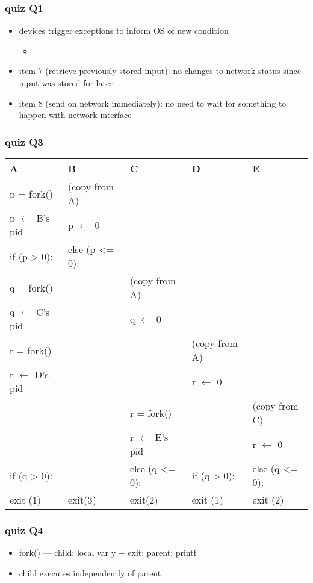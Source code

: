 
\begin{frame}
\frametitle{quiz Q1}
\begin{itemize}
\item devices trigger exceptions to inform OS of new condition
    \begin{itemize}
    \item {}
    \end{itemize}
\vspace{.5cm}
\item item 7 (retrieve previously stored input): no changes to network status since input was stored for later
\item item 8 (send on network immediately): no need to wait for something to happen with network interface
\end{itemize}
\end{frame}

\begin{frame}
\frametitle{quiz Q3}
\fontsize{13}{14}\selectfont
\begin{tabular}{l|l|l|l|l}
A & B & C & D & E \\ \hline
p = fork() & (copy from A)& & &\\
p $\leftarrow$ B's pid & p $\leftarrow$ 0 & & \\
if (p > 0): & else (p <= 0): & & \\
q = fork() & & (copy from A) & & \\
q $\leftarrow$ C's pid & & q $\leftarrow$ 0 &  \\
    r = fork()  &  & &  (copy from A) &  \\
r $\leftarrow$ D's pid  & & & r $\leftarrow$ 0 \\
~           & ~ & r = fork() &  & (copy from C)\\
~           & ~ & r $\leftarrow$ E's pid & ~ & r $\leftarrow$ 0 \\
if (q > 0): & ~ & else (q <= 0): & if (q > 0): & else (q <= 0): \\
exit (1) & exit(3) & exit(2) & exit (1) & exit (2) \\
\end{tabular}
\end{frame}

\begin{frame}
\frametitle{quiz Q4}
\begin{itemize}
\item fork() --- child: local var y + exit; parent: printf
\item child executes independently of parent
\end{itemize}
\end{frame}
